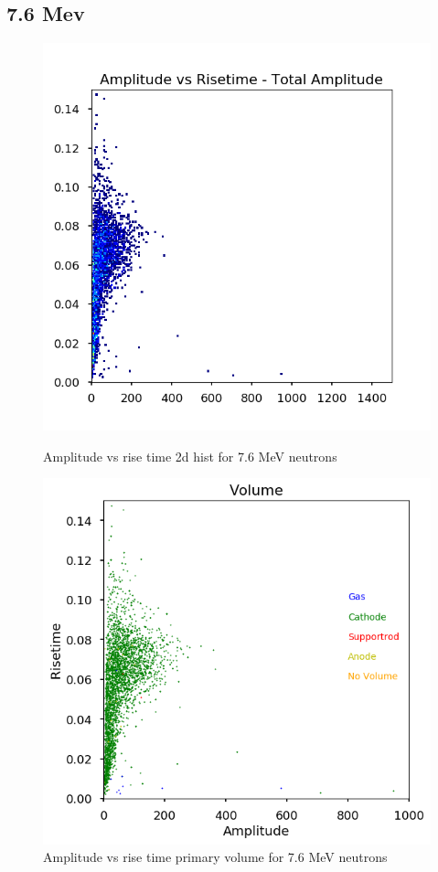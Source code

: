 \documentclass[a4paper]{article}
\begin{document}
\subsection{7.6 Mev}
\begin{figure}[H]
    \centering
    \begin{minipage}{.5\textwidth}
        \centering
        \includegraphics[width=1\linewidth]{Fast/steel_achinos-2d_fast-8.png}
        \caption{Amplitude vs rise time 2d hist for 7.6 MeV neutrons}
        \label{fig:prob1_6_2}
    \end{minipage}%
    \begin{minipage}{0.5\textwidth}
        \centering
        \includegraphics[width=1\linewidth]{Fast/steel_achinos_vol_38_fast-8.png}
        \caption{Amplitude vs rise time primary volume for 7.6 MeV neutrons}
        \label{fig:prob1_6_1}
    \end{minipage}
\end{figure}
\end{document}
